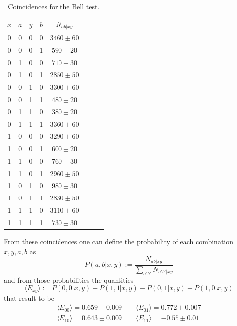 \documentclass[a4paper, 11pt]{article}
\begin{document}
    \begin{table}[H]
      \centering
      \begin{tabular}{cccccccc}
        \toprule
        $x$ & $a$ & $y$ & $b$ & $N_{ab|xy}$ \\
        \midrule
        0 & 0 & 0 & 0 & $3460 \pm 60$ \\
        0 & 0 & 0 & 1 & $590 \pm 20$ \\
        0 & 1 & 0 & 0 & $710 \pm 30$ \\
        0 & 1 & 0 & 1 & $2850 \pm 50$ \\
        \midrule
        0 & 0 & 1 & 0 & $3300 \pm 60$ \\
        0 & 0 & 1 & 1 & $480 \pm 20$ \\
        0 & 1 & 1 & 0 & $380 \pm 20$ \\
        0 & 1 & 1 & 1 & $3360 \pm 60$ \\
        \midrule
        1 & 0 & 0 & 0 & $3290 \pm 60$ \\
        1 & 0 & 0 & 1 & $600 \pm 20$ \\
        1 & 1 & 0 & 0 & $760 \pm 30$ \\
        1 & 1 & 0 & 1 & $2960 \pm 50$ \\
        \midrule
        1 & 0 & 1 & 0 & $980 \pm 30$ \\
        1 & 0 & 1 & 1 & $2830 \pm 50$ \\
        1 & 1 & 1 & 0 & $3110 \pm 60$ \\
        1 & 1 & 1 & 1 & $730 \pm 30$ \\
        \bottomrule
      \end{tabular}
      \caption{Coincidences for the Bell test.}
      \label{tab:Bell_coinc}
    \end{table}

    From these coincidences one can define the probability of each combination $x,y,a,b$ as
    \begin{equation*}
      P(a,b|x,y) := \frac{N_{ab|xy}}{\sum_{a'b'}N_{a'b'|xy}}
    \end{equation*}
    and from those probabilities the quantities
    \begin{equation*}
      \langle E_{xy} \rangle := P(0,0|x,y) + P(1,1|x,y) - P(0,1|x,y) - P(1,0|x,y)
    \end{equation*}
    that result to be
    \begin{gather*}
      \langle E_{00} \rangle = 0.659 \pm 0.009 \qquad \langle E_{01} \rangle = 0.772 \pm 0.007 \\
      \langle E_{10} \rangle = 0.643 \pm 0.009 \qquad \langle E_{11} \rangle = -0.55 \pm 0.01
    \end{gather*}
\end{document}
